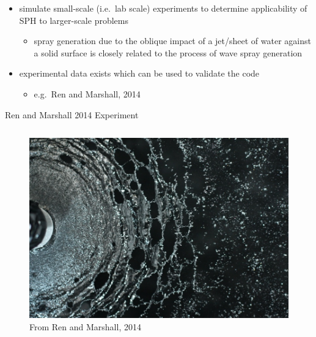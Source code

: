 \begin{frame}{\thesec}{\thesubsec}
  \vspace*{-2\baselineskip}
  \begin{itemize}
    \item{
	  simulate small-scale (i.e.~lab scale) experiments to determine applicability of SPH to larger-scale problems
	  \begin{itemize}
	    \item{
	      spray generation due to the oblique impact of a jet/sheet of water against a solid surface is closely related to the process of wave spray generation
	    }
	  \end{itemize}
	}
	\vspace*{\baselineskip}
	\item{
	  experimental data exists which can be used to validate the code
	  \begin{itemize}
	    \item{e.g.~Ren and Marshall, 2014}
	  \end{itemize}
	}
  \end{itemize}
\end{frame}

\begin{frame}{\thesec}{Ren and Marshall 2014 Experiment}
  \vspace*{-\baselineskip}
  \begin{columns}
    \begin{column}{\paperwidth}
      \begin{figure}
        \centering
        \includegraphics[width=\paperwidth]{img/flappingSheetBreakup2.png}
        \caption{From Ren and Marshall, 2014}
        \label{fig:ren_marshall_breakup_15300}
      \end{figure}
    \end{column}
  \end{columns}
\end{frame}

